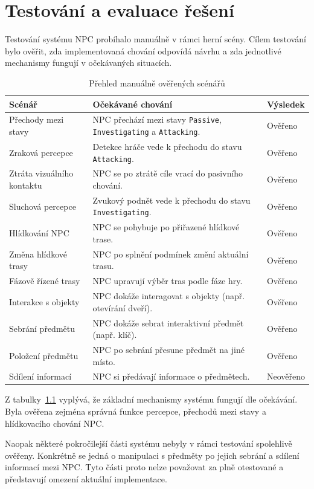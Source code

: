 \chapter{Testování a evaluace řešení}
\label{sec:testing}

Testování systému NPC probíhalo manuálně v rámci herní scény. 
Cílem testování bylo ověřit, zda implementovaná chování odpovídá návrhu a zda jednotlivé mechanismy fungují v očekávaných situacích.

\begin{table}[htbp]
\centering
\begin{tabular}{|p{}|p{}|p{}|}
\hline
\textbf{Scénář} & \textbf{Očekávané chování} & \textbf{Výsledek} \\
\hline
Přechody mezi stavy & NPC přechází mezi stavy \texttt{Passive}, \texttt{Investigating} a \texttt{Attacking}. & Ověřeno \\
\hline
Zraková percepce & Detekce hráče vede k přechodu do stavu \texttt{Attacking}. & Ověřeno \\
\hline
Ztráta vizuálního kontaktu & NPC se po ztrátě cíle vrací do pasivního chování. & Ověřeno \\
\hline
Sluchová percepce & Zvukový podnět vede k přechodu do stavu \texttt{Investigating}. & Ověřeno \\
\hline
Hlídkování NPC & NPC se pohybuje po přiřazené hlídkové trase. & Ověřeno \\
\hline
Změna hlídkové trasy & NPC po splnění podmínek změní aktuální trasu. & Ověřeno \\
\hline
Fázově řízené trasy & NPC upravují výběr tras podle fáze hry. & Ověřeno \\
\hline
Interakce s objekty & NPC dokáže interagovat s objekty (např. otevírání dveří). & Ověřeno \\
\hline
Sebrání předmětu & NPC dokáže sebrat interaktivní předmět (např. klíč). & Ověřeno \\
\hline
Položení předmětu & NPC po sebrání přesune předmět na jiné místo. & Ověřeno \\
\hline
Sdílení informací & NPC si předávají informace o předmětech. & Neověřeno \\
\hline
\end{tabular}
\caption{Přehled manuálně ověřených scénářů}
\label{tab:testovaci-scenare}
\end{table}

Z tabulky~\ref{tab:testovaci-scenare} vyplývá, že základní mechanismy systému fungují dle očekávání. 
Byla ověřena zejména správná funkce percepce, přechodů mezi stavy a hlídkovacího chování NPC.

Naopak některé pokročilejší části systému nebyly v rámci testování spolehlivě ověřeny. 
Konkrétně se jedná o manipulaci s předměty po jejich sebrání a sdílení informací mezi NPC. 
Tyto části proto nelze považovat za plně otestované a představují omezení aktuální implementace.